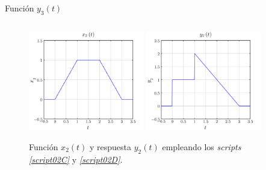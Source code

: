 \documentclass[a4paper,12pt,final]{article}
\begin{document}
      \begin{listing}[H]
        \caption{Función $y_3\left(t\right)$}
        \label{script02F}
        \inputminted{matlab}{./laboratorio_3/p2_Y3.m}
      \end{listing}

      \begin{figure}[H]
          \caption{Función $x_2\left(t\right)$ y respuesta $y_2\left(t\right)$ empleando los \emph{scripts \ref{script02C}} y \emph{\ref{script02D}}.}
          \label{script02Afigure}
          \begin{center}
              \includegraphics[width=0.45\textwidth]{./laboratorio_3/problema02_X2.png}
              \includegraphics[width=0.45\textwidth]{./laboratorio_3/problema02_Y2.png}
          \end{center}
      \end{figure}
\end{document}
